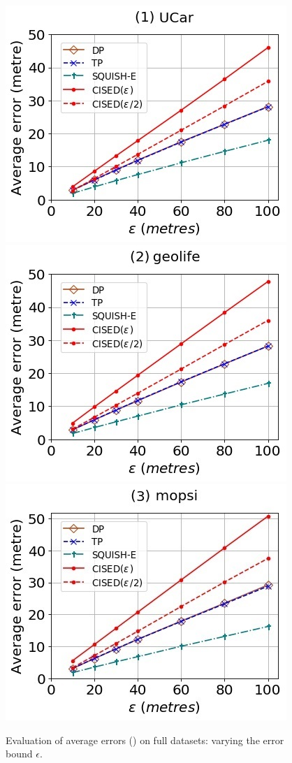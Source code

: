 \begin{figure}[tb!]
	\centering
	\includegraphics[scale=0.500]{Figures/Exp-SED-error-epsilon-service.jpg}	\hspace{2ex}
	\includegraphics[scale=0.500]{Figures/Exp-SED-error-epsilon-geolife.jpg}	\hspace{2ex}
	\includegraphics[scale=0.500]{Figures/Exp-SED-error-epsilon-mopsi.jpg}		
	\vspace{-2ex}
	\caption{\small Evaluation of average errors (\sed) on full datasets: varying the error bound $\epsilon$.}
	\label{fig:ae-sed-epsilon}
	\vspace{-2ex}
\end{figure}


